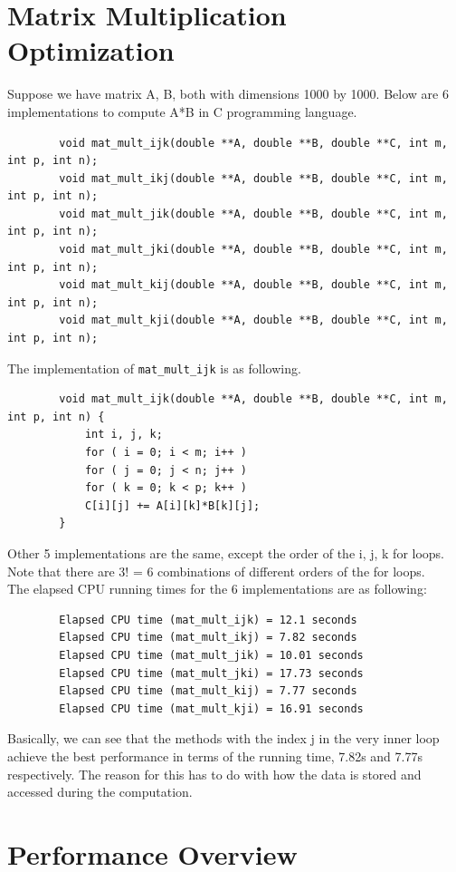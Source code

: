 \documentclass[12pt]{article}
\begin{document}
 	\section{Matrix Multiplication Optimization \cite{12}}
 	Suppose we have matrix A, B, both with dimensions 1000 by 1000. Below are 6 implementations to compute A*B in C programming language.
 	\begin{lstlisting}
 		void mat_mult_ijk(double **A, double **B, double **C, int m, int p, int n);
 		void mat_mult_ikj(double **A, double **B, double **C, int m, int p, int n);
 		void mat_mult_jik(double **A, double **B, double **C, int m, int p, int n);
 		void mat_mult_jki(double **A, double **B, double **C, int m, int p, int n);
 		void mat_mult_kij(double **A, double **B, double **C, int m, int p, int n);
 		void mat_mult_kji(double **A, double **B, double **C, int m, int p, int n);
 	\end{lstlisting}
 	The implementation of \texttt{mat\_mult\_ijk} is as following. 
 	\begin{lstlisting}
 		void mat_mult_ijk(double **A, double **B, double **C, int m, int p, int n) {
 			int i, j, k;
 			for ( i = 0; i < m; i++ )
 			for ( j = 0; j < n; j++ )
 			for ( k = 0; k < p; k++ )
 			C[i][j] += A[i][k]*B[k][j];
 		}
 	\end{lstlisting}
 	
 	Other 5 implementations are the same, except the order of the i, j, k for loops. Note that there are 3! = 6 combinations of different orders of the for loops.\\The elapsed CPU running times for the 6 implementations are as following:
 	\begin{lstlisting}
 		Elapsed CPU time (mat_mult_ijk) = 12.1 seconds
 		Elapsed CPU time (mat_mult_ikj) = 7.82 seconds
 		Elapsed CPU time (mat_mult_jik) = 10.01 seconds
 		Elapsed CPU time (mat_mult_jki) = 17.73 seconds
 		Elapsed CPU time (mat_mult_kij) = 7.77 seconds
 		Elapsed CPU time (mat_mult_kji) = 16.91 seconds
 	\end{lstlisting}
 	Basically, we can see that the methods with the index j in the very inner loop achieve the best performance in terms of the running time, 7.82s and 7.77s respectively. The reason for this has to do with how the data is stored and accessed during the computation.
 	\newpage
 	\section{Performance Overview} 
\end{document}
